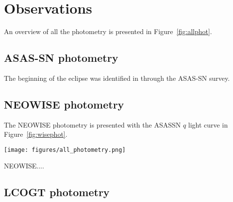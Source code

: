 \documentclass{aa}
\begin{document}
\section{Observations}\label{sec:obs}
An overview of all the photometry is presented in Figure~\ref{fig:allphot}.





\subsection{ASAS-SN photometry}

The beginning of the eclipse was identified in \citet{RizzoSmith21} through the ASAS-SN survey.
%

\subsection{NEOWISE photometry}

The NEOWISE photometry is presented with the ASASSN $q$ light curve in Figure~\ref{fig:wisephot}.

\begin{figure*}
   \begin{centering}
   \texttt{[image: figures/all\_photometry.png]}
      \caption{NEOWISE $W1$ and $W2$ photometry of the star, with the WISE color in the lowest panel.
      The $NEOWISE$ color changes from colourless to very red, which fades back towards colourless over $\sim 500$ days.
              }
              \label{fig:wisephot}
              \end{centering}
       \end{figure*}




NEOWISE....



\subsection{LCOGT photometry}
\end{document}
